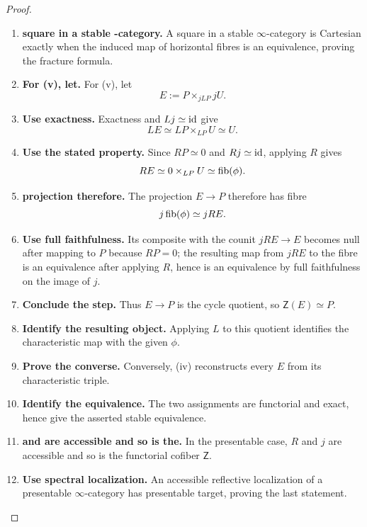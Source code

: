 \begin{proof}
\begin{enumerate}[label=\textup{(\arabic*)}]
    \item \textbf{square in a stable -category.}
    A square in a stable \(\infty\)-category is Cartesian exactly when the induced map of
    horizontal fibres is an equivalence, proving the fracture formula.

    \item \textbf{For (v), let.}
    For \textup{(v)}, let
    \[
            E:=P\times_{jLP}jU.
        \]

    \item \textbf{Use exactness.}
    Exactness and \(Lj\simeq\operatorname{id}\) give
    \[
            LE\simeq LP\times_{LP}U\simeq U.
        \]

    \item \textbf{Use the stated property.}
    Since \(RP\simeq0\) and \(Rj\simeq\operatorname{id}\), applying \(R\) gives
    \[
            RE\simeq0\times_{LP}U\simeq\operatorname{fib}(\phi).
        \]

    \item \textbf{projection therefore.}
    The projection \(E\to P\) therefore has fibre
    \[
            j\operatorname{fib}(\phi)\simeq jRE.
        \]

    \item \textbf{Use full faithfulness.}
    Its composite with the counit \(jRE\to E\) becomes null after mapping to \(P\) because
    \(RP=0\); the resulting map from \(jRE\) to the fibre is an equivalence after
    applying \(R\), hence is an equivalence by full faithfulness on the image of
    \(j\).

    \item \textbf{Conclude the step.}
    Thus \(E\to P\) is the cycle quotient, so \(\mathsf Z(E)\simeq P\).

    \item \textbf{Identify the resulting object.}
    Applying \(L\) to this quotient identifies the characteristic map with the given
    \(\phi\).

    \item \textbf{Prove the converse.}
    Conversely, \textup{(iv)} reconstructs every \(E\) from its characteristic triple.

    \item \textbf{Identify the equivalence.}
    The two assignments are functorial and exact, hence give the asserted stable equivalence.

    \item \textbf{and are accessible and so is the.}
    In the presentable case, \(R\) and \(j\) are accessible and so is the functorial
    cofiber \(\mathsf Z\).

    \item \textbf{Use spectral localization.}
    An accessible reflective localization of a presentable \(\infty\)-category has presentable
    target, proving the last statement.
\end{enumerate}
\end{proof}
